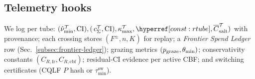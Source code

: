 \subsection*{Telemetry hooks}
We log per tube: $(\hat\nu_{\min}^\mathcal T,\text{CI}),(\,c_\Sigma^\mathcal T,\text{CI}),\kappa_{\max}^\mathcal T,\constref{rtube},\overline C_{\mathrm{salt}}^\mathcal T)$ with provenance; each crossing stores $(F^\pm,n,K)$ for replay; a \emph{Frontier Spend Ledger} row (Sec.~\ref{subsec:frontier-ledger}); grazing metrics $(p_{\mathrm{graze}},\theta_{\min})$; conservativity constants $(C_{R,\mathrm{fr}},C_{R,\mathrm{cbf}})$; residual-CI evidence per active CBF; and switching certificates (CQLF $P$ hash or $\tau_{\min}^{\mathrm{sw}}$).

